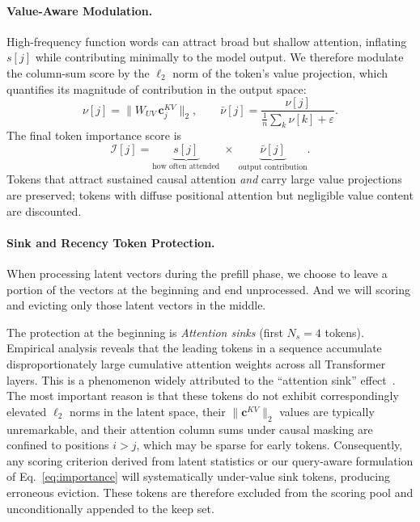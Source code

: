 \documentclass[letterpaper]{article} %
\begin{document}
\paragraph{Value-Aware Modulation.}
High-frequency function words can attract broad but shallow attention,
inflating $s[j]$ while contributing minimally to the model output.
We therefore modulate the column-sum score by the $\ell_2$ norm of the
token's value projection, which quantifies its magnitude of contribution
in the output space:
\begin{equation}
  \nu[j] = \bigl\|W_{UV}\,\mathbf{c}_j^{KV}\bigr\|_2,
  \qquad
  \bar\nu[j] = \frac{\nu[j]}{\frac{1}{n}\sum_{k}\nu[k] + \varepsilon}.
  \label{eq:valnorm}
\end{equation}
The final token importance score is
\begin{equation}
  \mathcal{I}[j]
  = \underbrace{s[j]}_{\text{how often attended}}
    \;\times\;
    \underbrace{\bar\nu[j]}_{\text{output contribution}}.
  \label{eq:importance}
\end{equation}
Tokens that attract sustained causal attention \emph{and} carry large value
projections are preserved; tokens with diffuse positional attention but
negligible value content are discounted.



\paragraph{Sink and Recency Token Protection.}
When processing latent vectors during the prefill phase, we choose to leave a portion of 
the vectors at the beginning and end unprocessed. And we will scoring and evicting only 
those latent vectors in the middle.

The protection at the beginning is \emph{Attention sinks} (first $N_s = 4$ tokens).
Empirical analysis reveals that the leading tokens in a sequence
accumulate disproportionately large cumulative attention weights
across all Transformer layers. This is a phenomenon widely attributed to the
``attention sink'' effect~\cite{xiao2024streamingllm}.
The most important reason is that these tokens do not exhibit correspondingly elevated
$\ell_2$ norms in the latent space, their $\|\mathbf{c}^{KV}\|_2$ values are
typically unremarkable, and their attention column sums under causal masking
are confined to positions $i > j$, which may be sparse for early tokens.
Consequently, any scoring criterion derived from latent statistics or our 
query-aware formulation of Eq.~\eqref{eq:importance} will
systematically under-value sink tokens, producing erroneous eviction.
These tokens are therefore excluded from the scoring pool and unconditionally
appended to the keep set.
\end{document}
